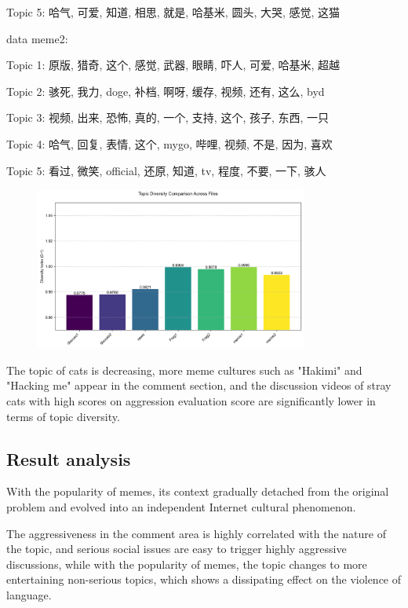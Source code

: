 \documentclass[12pt,a4paper]{ctexart}
\begin{document}
Topic 5: 哈气, 可爱, 知道, 相思, 就是, 哈基米, 圆头, 大哭, 感觉, 这猫

data meme2:

Topic 1: 原版, 猎奇, 这个, 感觉, 武器, 眼睛, 吓人, 可爱, 哈基米, 超越

Topic 2: 骇死, 我力, doge, 补档, 啊呀, 缓存, 视频, 还有, 这么, byd

Topic 3: 视频, 出来, 恐怖, 真的, 一个, 支持, 这个, 孩子, 东西, 一只

Topic 4: 哈气, 回复, 表情, 这个, mygo, 哔哩, 视频, 不是, 因为, 喜欢

Topic 5: 看过, 微笑, official, 还原, 知道, tv, 程度, 不要, 一下, 骇人

\begin{figure}[htbp]
    \centering
    \includegraphics[width=0.8\textwidth]{img/topic_diversity.png}
\end{figure}
\newpage

The topic of cats is decreasing, more meme cultures such as "Hakimi" and "Hacking me" appear in the comment section, and the discussion videos of stray cats with high scores on aggression evaluation score are significantly lower in terms of topic diversity.

\subsection{Result analysis}

With the popularity of memes, its context gradually detached from the original problem and evolved into an independent Internet cultural phenomenon.

The aggressiveness in the comment area is highly correlated with the nature of the topic, and serious social issues are easy to trigger highly aggressive discussions, while with the popularity of memes, the topic changes to more entertaining non-serious topics, which shows a dissipating effect on the violence of language.
\end{document}
